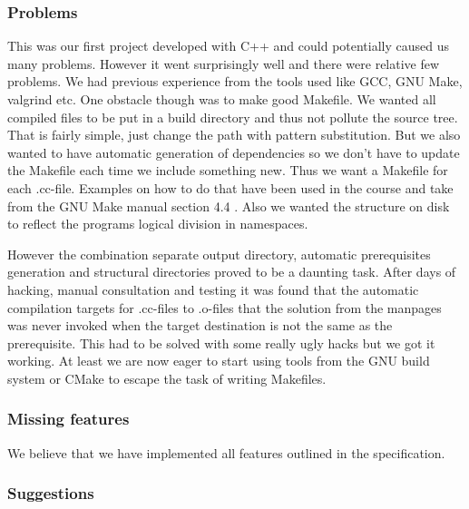 \documentclass[10pt, a4paper]{article}
\begin{document}
\subsubsection{Problems}
This was our first project developed with C++ and could potentially caused us many problems. However it went surprisingly well and there were relative few problems. We had previous experience from the tools used like GCC, GNU Make, valgrind etc. One obstacle though was to make good Makefile. We wanted all compiled files to be put in a build directory and thus not pollute the source tree. That is fairly simple, just change the path with pattern substitution. But we also wanted to have automatic generation of dependencies so we don't have to update the Makefile each time we include something new. Thus we want a Makefile for each .cc-file. Examples on how to do that have been used in the course and take from the GNU Make manual section 4.4 \cite{makeman}. Also we wanted the structure on disk to reflect the programs logical division in namespaces.

However the combination separate output directory, automatic prerequisites generation and structural directories proved to be a daunting task. After days of hacking, manual consultation and testing it was found that the automatic compilation targets for .cc-files to .o-files that the solution from the manpages was never invoked when the target destination is not the same as the prerequisite. This had to be solved with some really ugly hacks but we got it working. At least we are now eager to start using tools from the GNU build system or CMake to escape the task of writing Makefiles.


\subsubsection{Missing features}
We believe that we have implemented all features outlined in the specification.

\subsubsection{Suggestions}




\emph{\cite{dummy+ref}} 
\newpage


\end{document}
